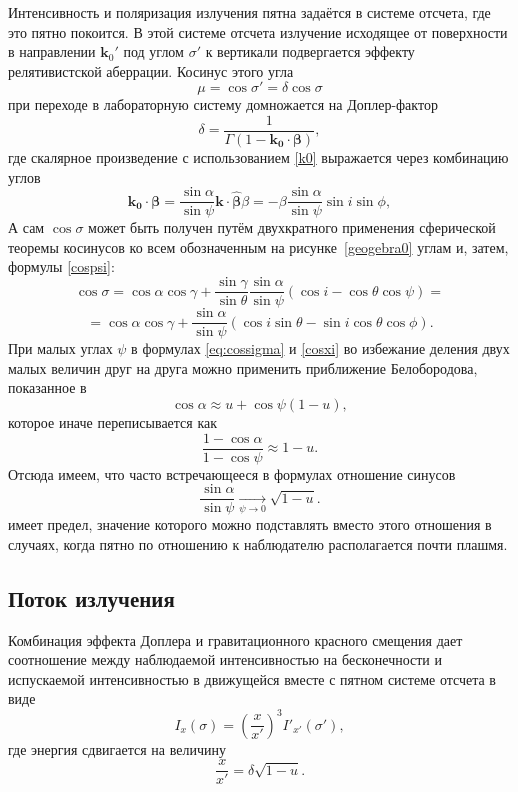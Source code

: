 \documentclass[14pt,a4paper]{extarticle}
\newcommand{\be}{\begin{equation}}
\newcommand{\ee}{\end{equation}}
\begin{document}
		    Интенсивность и поляризация излучения пятна задаётся в системе отсчета, где это пятно покоится. 
		    В этой системе отсчета излучение исходящее от поверхности в направлении 
		    $\bm{k}_0'$
		    под углом 
		    $\sigma'$
		    к вертикали подвергается эффекту релятивистской аберрации. 
		    Косинус этого угла 
		    \be\label{eq:cossigmaprime}
		    	\mu=\cos \sigma'=\delta\cos\sigma
		    \ee
		    при переходе в лабораторную систему домножается \cite{Poutanen2003} на Доплер-фактор
		    \be\label{Doppler-factor}
		    	\delta=\frac1{\Gamma(1-\bm{k_0}\cdot\bm{\beta})},
		    \ee
		    где скалярное произведение с использованием \eqref{k0} выражается через комбинацию углов
		  	\be\label{cosxi}
		  		\bm{k_0}\cdot\bm{\beta}=\frac{\sin \alpha }{\sin\psi} \bm{k}\cdot\bm{\hat\beta} \beta=
		  		- \beta \frac{\sin \alpha }{\sin\psi} \sin i \sin \phi,
		  	\ee
		  	А сам $\cos \sigma$ может быть получен путём двухкратного применения сферической теоремы косинусов 
		  	ко всем обозначенным на рисунке~\ref{geogebra0} углам 
		  	и, затем, формулы \eqref{cospsi}:
			$$
		  		\cos\sigma=\cos \alpha \cos \gamma + 
		  		\frac{\sin\gamma}{\sin\theta}
		  		\frac{\sin\alpha}{\sin\psi}
		  		(\cos i - \cos\theta \cos\psi) =
		  	$$\be\label{eq:cossigma}
		  		=\cos \alpha \cos \gamma + 
		  		\frac{\sin\alpha}{\sin\psi}
		  		(\cos i \sin\theta - \sin i \cos\theta \cos\phi).
		  	\ee
			При малых углах $\psi$ в формулах
		  	\ref{eq:cossigma}
			и
		  	\ref{cosxi}
			во избежание деления двух малых величин друг на друга можно применить приближение Белобородова, показанное в  \cite{Beloborodov2002}
			\be\label{eq:beloborodovsapproximation}
				\cos\alpha\approx u + \cos\psi (1-u),
			\ee 
			которое иначе переписывается как
			\be
				\frac{1-\cos\alpha}{1-\cos\psi}\approx  1-u.
			\ee
			Отсюда имеем, что часто встречающееся в формулах
			отношение синусов
			\be\label{sinalphaoversinpsi}
				\frac{\sin\alpha}{\sin\psi} \underset{\psi \to 0}{\rightarrow} \sqrt{1-u}.
			\ee
			имеет предел, значение которого можно подставлять вместо этого отношения в случаях, когда пятно по отношению к наблюдателю располагается  
			почти плашмя.


		\subsection{Поток излучения}\label{sub:EF}
			Комбинация эффекта Доплера и гравитационного красного смещения дает соотношение \cite{Misner1973} между наблюдаемой интенсивностью на бесконечности и испускаемой интенсивностью в движущейся вместе с пятном системе отсчета в виде 
			\be\label{eq:shifts}
				I_x(\sigma)=\left(\frac{x}{x'}\right)^3 I'_{x'}(\sigma'),
			\ee
			где энергия сдвигается на величину
			\be
				\frac{x}{x'}=\delta\sqrt{1-u}.
			\ee
\end{document}
